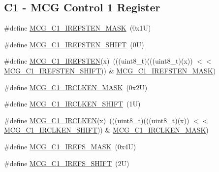 \subsection*{C1 -\/ M\+CG Control 1 Register}
\begin{DoxyCompactItemize}
\item 
\#define \mbox{\hyperlink{group___m_c_g___register___masks_ga275f9145f8c55ff4c836cbd20ab06139}{M\+C\+G\+\_\+\+C1\+\_\+\+I\+R\+E\+F\+S\+T\+E\+N\+\_\+\+M\+A\+SK}}~(0x1\+U)
\item 
\#define \mbox{\hyperlink{group___m_c_g___register___masks_ga10e0a80bfe715350aba6d5f5212617bc}{M\+C\+G\+\_\+\+C1\+\_\+\+I\+R\+E\+F\+S\+T\+E\+N\+\_\+\+S\+H\+I\+FT}}~(0\+U)
\item 
\#define \mbox{\hyperlink{group___m_c_g___register___masks_gae9002ca9879cd655f9e39f1829b40a03}{M\+C\+G\+\_\+\+C1\+\_\+\+I\+R\+E\+F\+S\+T\+EN}}(x)~(((uint8\+\_\+t)(((uint8\+\_\+t)(x)) $<$$<$ \mbox{\hyperlink{group___m_c_g___register___masks_ga10e0a80bfe715350aba6d5f5212617bc}{M\+C\+G\+\_\+\+C1\+\_\+\+I\+R\+E\+F\+S\+T\+E\+N\+\_\+\+S\+H\+I\+FT}})) \& \mbox{\hyperlink{group___m_c_g___register___masks_ga275f9145f8c55ff4c836cbd20ab06139}{M\+C\+G\+\_\+\+C1\+\_\+\+I\+R\+E\+F\+S\+T\+E\+N\+\_\+\+M\+A\+SK}})
\item 
\#define \mbox{\hyperlink{group___m_c_g___register___masks_ga50398d9dc80a3016fddc6a2aef3df994}{M\+C\+G\+\_\+\+C1\+\_\+\+I\+R\+C\+L\+K\+E\+N\+\_\+\+M\+A\+SK}}~(0x2\+U)
\item 
\#define \mbox{\hyperlink{group___m_c_g___register___masks_ga2c4305645e7c2b3977dcd0d35c7eaab9}{M\+C\+G\+\_\+\+C1\+\_\+\+I\+R\+C\+L\+K\+E\+N\+\_\+\+S\+H\+I\+FT}}~(1\+U)
\item 
\#define \mbox{\hyperlink{group___m_c_g___register___masks_ga9fc55b990e5876cb6fbeef0bf7caa040}{M\+C\+G\+\_\+\+C1\+\_\+\+I\+R\+C\+L\+K\+EN}}(x)~(((uint8\+\_\+t)(((uint8\+\_\+t)(x)) $<$$<$ \mbox{\hyperlink{group___m_c_g___register___masks_ga2c4305645e7c2b3977dcd0d35c7eaab9}{M\+C\+G\+\_\+\+C1\+\_\+\+I\+R\+C\+L\+K\+E\+N\+\_\+\+S\+H\+I\+FT}})) \& \mbox{\hyperlink{group___m_c_g___register___masks_ga50398d9dc80a3016fddc6a2aef3df994}{M\+C\+G\+\_\+\+C1\+\_\+\+I\+R\+C\+L\+K\+E\+N\+\_\+\+M\+A\+SK}})
\item 
\#define \mbox{\hyperlink{group___m_c_g___register___masks_gadc14970d17e8ee736a16805a412a87fe}{M\+C\+G\+\_\+\+C1\+\_\+\+I\+R\+E\+F\+S\+\_\+\+M\+A\+SK}}~(0x4\+U)
\item 
\#define \mbox{\hyperlink{group___m_c_g___register___masks_gada376a938782b95d20788418a2564476}{M\+C\+G\+\_\+\+C1\+\_\+\+I\+R\+E\+F\+S\+\_\+\+S\+H\+I\+FT}}~(2\+U)

\end{DoxyCompactItemize}
